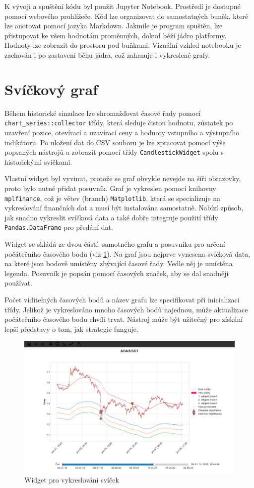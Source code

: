 K vývoji a spuštění kódu byl použit Jupyter Notebook.
Prostředí je dostupné pomocí webového prohlížeče.
Kód lze organizovat do samostatných buněk, které lze anotovat pomocí jazyka Markdown.
Jakmile je program spuštěn, lze přistupovat ke všem hodnotám proměnných, dokud běží jádro platformy.
Hodnoty lze zobrazit do prostoru pod buňkami.
Vizuální vzhled notebooku je zachován i po zastavení běhu jádra, což zahrnuje i vykreslené grafy.

\section{Svíčkový graf}
Během historické simulace lze shromažďovat časové řady pomocí \texttt{chart\_series::collector} třídy, která sleduje čistou hodnotu, zůstatek po uzavření pozice, otevírací a uzavírací ceny a hodnoty vstupního a výstupního indikátoru.
Po uložení dat do CSV souboru je lze zpracovat pomocí výše popsaných nástrojů a zobrazit pomocí třídy \texttt{CandlestickWidget} spolu s historickými svíčkami.

Vlastní widget byl vyvinut, protože se graf obvykle nevejde na šíři obrazovky, proto bylo nutné přidat posuvník.
Graf je vykreslen pomocí knihovny \texttt{mplfinance}, což je větev (branch) \texttt{Matplotlib}, která se specializuje na vykreslování finančních dat a musí být instalována samostatně.
Nabízí způsob, jak snadno vykreslit svíčková data a také dobře integruje použití třídy \texttt{Pandas.DataFrame} pro předání dat.

Widget se skládá ze dvou částí: samotného grafu a posuvníku pro určení počátečního časového bodu (viz \ref{fig:historical-simulation-widget}).
Na graf jsou nejprve vynesena svíčková data, na které jsou bodově umístěny zbývající časové řady.
Vedle něj je umístěna legenda.
Posuvník je popsán pomocí časových značek, aby se dal snadněji používat.

Počet viditelných časových bodů a název grafu lze specifikovat při inicializaci třídy.
Jelikož je vykreslováno mnoho časových bodů najednou, může aktualizace počátečního časového bodu chvíli trvat.
Nástroj může být užitečný pro získání lepší představy o tom, jak strategie funguje.

\begin{figure}[htbp]
\centerline{\includegraphics[scale=0.30]{img/historical-simulation-widget-2.png}}
\caption{Widget pro vykreslování svíček}
\label{fig:historical-simulation-widget}
\end{figure}

